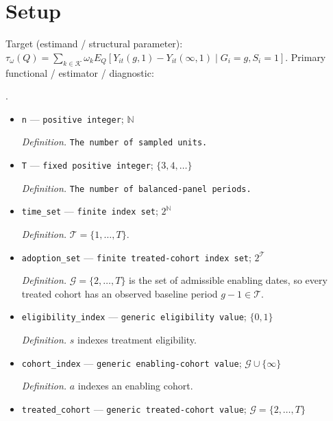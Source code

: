 \documentclass{article}
\begin{document}
\section{Setup}

Target (estimand / structural parameter): \(\tau_\omega(Q)=\sum_{k\in\mathcal K}\omega_kE_Q[Y_{it}(g,1)-Y_{it}(\infty,1)\mid G_i=g,S_i=1]\).
Primary functional / estimator / diagnostic: \leavevmode\par\noindent {}\par\noindent.
\begin{itemize}
  \item \texttt{n} --- \texttt{positive integer}; \(\mathbb N\)
  \par\smallskip\noindent\emph{Definition.} \texttt{The number of sampled units.}
  \item \texttt{T} --- \texttt{fixed positive integer}; \(\{3,4,\ldots\}\)
  \par\smallskip\noindent\emph{Definition.} \texttt{The number of balanced-\allowbreak{}panel periods.}
  \item \texttt{time\_\allowbreak{}set} --- \texttt{finite index set}; \(2^{\mathbb N}\)
  \par\smallskip\noindent\emph{Definition.} \(\mathcal T=\{1,\ldots,T\}\).
  \item \texttt{adoption\_\allowbreak{}set} --- \texttt{finite treated-\allowbreak{}cohort index set}; \(2^{\mathcal T}\)
  \par\smallskip\noindent\emph{Definition.} \(\mathcal G=\{2,\ldots,T\}\) is the set of admissible enabling dates, so every treated cohort has an observed baseline period \(g-1\in\mathcal T\).
  \item \texttt{eligibility\_\allowbreak{}index} --- \texttt{generic eligibility value}; \(\{0,1\}\)
  \par\smallskip\noindent\emph{Definition.} \(s\) indexes treatment eligibility.
  \item \texttt{cohort\_\allowbreak{}index} --- \texttt{generic enabling-\allowbreak{}cohort value}; \(\mathcal G\cup\{\infty\}\)
  \par\smallskip\noindent\emph{Definition.} \(a\) indexes an enabling cohort.
  \item \texttt{treated\_\allowbreak{}cohort} --- \texttt{generic treated-\allowbreak{}cohort value}; \(\mathcal G=\{2,\ldots,T\}\)

\end{itemize}
\end{document}
